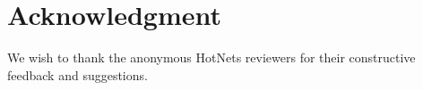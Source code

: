 \section{Acknowledgment}
\label{sec:ack}
We wish to thank the anonymous HotNets reviewers for their constructive
feedback and suggestions.
